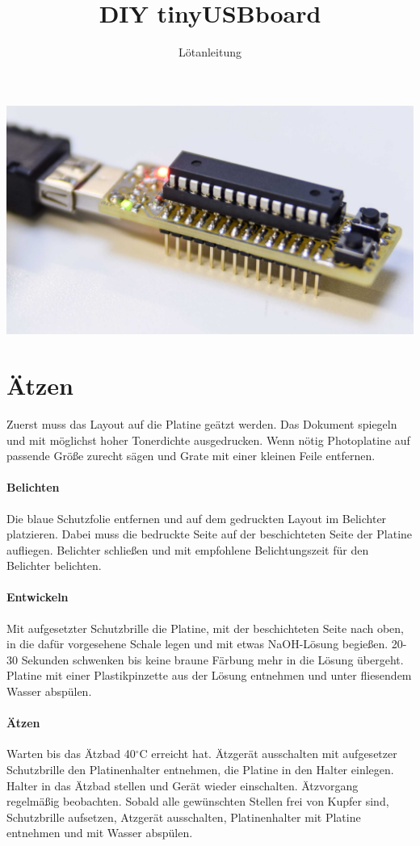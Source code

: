 \title{DIY tinyUSBboard}
\subtitle{Lötanleitung}
\includegraphics[width=\columnwidth]{images/diy-tinusbboard.jpg}
\section{Ätzen}
Zuerst muss das Layout auf die Platine geätzt werden.
Das Dokument spiegeln und mit möglichst hoher Tonerdichte ausgedrucken. Wenn nötig Photoplatine auf passende Größe zurecht sägen und Grate mit einer kleinen Feile entfernen. 
\paragraph*{Belichten} Die blaue Schutzfolie entfernen und auf dem gedruckten Layout im Belichter platzieren. Dabei muss die bedruckte Seite auf der beschichteten Seite der Platine aufliegen. Belichter schließen und mit empfohlene Belichtungszeit für den Belichter belichten. 
\paragraph*{Entwickeln} Mit aufgesetzter Schutzbrille die Platine, mit der beschichteten Seite nach oben, in die dafür vorgesehene Schale legen und mit etwas NaOH-Lösung begießen.
20-30 Sekunden schwenken bis keine braune Färbung mehr in die Lösung übergeht.
Platine mit einer Plastikpinzette aus der Lösung entnehmen und unter fliesendem Wasser abspülen.
\paragraph*{Ätzen} Warten bis das Ätzbad 40$^\circ$C erreicht hat. Ätzgerät ausschalten mit aufgesetzer Schutzbrille den Platinenhalter entnehmen, die Platine in den Halter einlegen. Halter in das Ätzbad stellen und Gerät wieder einschalten.
Ätzvorgang regelmäßig beobachten. Sobald alle gewünschten Stellen frei von Kupfer sind, Schutzbrille aufsetzen, Atzgerät ausschalten, Platinenhalter mit Platine entnehmen und mit Wasser abspülen.

